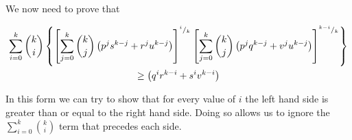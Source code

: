 We now need to prove that

\begin{multline}
 \sum_{i=0}^{k} \binom{k}{i} \left\{  \left[ \sum_{j=0}^{k} \binom{k}{j} \left( p^{j}s^{k-j} +  r^{j}u^{k-j} \right) \right]^{^i/_k}  \left[ \sum_{j=0}^{k} \binom{k}{j} \left( p^{j}q^{k-j} + v^{j}u^{k-j} \right) \right]^{^{k-i}/_k} \right\}  \\
 \geq  \left( q^{i}r^{k-i} +  s^{i}v^{k-i} \right)
 \notag
\end{multline}

In this form we can try to show that for every value of $i$ the left hand side is greater than or equal to the right hand side.  Doing so allows us to ignore the $\sum_{i=0}^{k} \binom{k}{i}$ term that precedes each side.  





